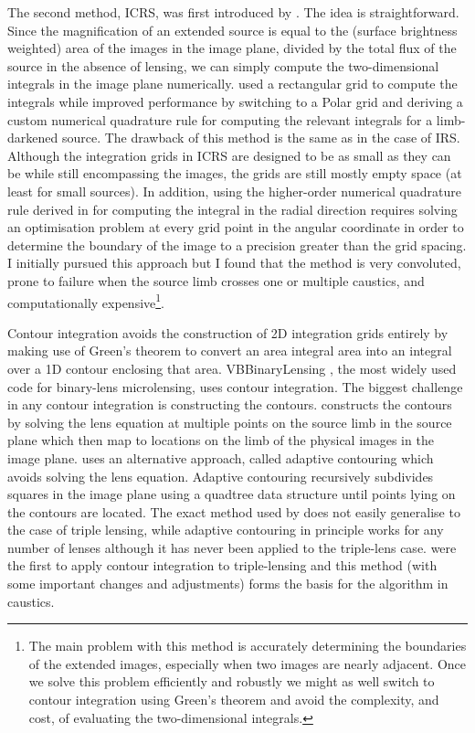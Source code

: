 \documentclass[12pt,dvipsnames]{report}
\newcommand{\ssf}[1]{\textsf{#1}}
\begin{document}
The second method, ICRS, was first introduced by \citet{1996ApJ...472..660B}.
The idea is straightforward. Since the magnification of an extended
source is equal to the (surface brightness weighted) area of the images in
the image plane, divided by the total flux of the source in the absence of
lensing, we can simply compute the two-dimensional integrals in the image plane
numerically. \citet{1996ApJ...472..660B} used a rectangular grid to compute the
integrals while \citet{2010ApJ...716.1408B} improved performance by switching
to a Polar grid and deriving a custom numerical quadrature rule for computing
the relevant integrals for a limb-darkened source. The drawback of this method
is the same as in the case of IRS. Although the integration grids in ICRS are
designed to be as small as they can be while still encompassing the images,
the grids are still mostly empty space (at least for small sources).
In addition, using the higher-order numerical quadrature rule derived in
\citet{2010ApJ...716.1408B} for computing the integral in the radial direction
requires solving an optimisation problem at every grid point in the angular
coordinate in order to determine the boundary of the image to a precision
greater than the grid spacing. 
I initially pursued this approach but I found that the
method is very convoluted, prone to failure when the source limb crosses one or
multiple caustics, and computationally expensive\footnote{The main problem with
    this method is accurately determining the boundaries of the extended images,
    especially when two images are nearly adjacent. Once we solve this problem
    efficiently and robustly we might as well switch to contour integration using
    Green's theorem and avoid the complexity, and cost, of evaluating the two-dimensional
    integrals.}.

Contour integration avoids the construction of 2D integration
grids entirely by making use of Green's theorem to convert an area integral
area into an integral over a 1D contour enclosing that area.  \ssf{VBBinaryLensing}
\citep{2010MNRAS.408.2188B}, the most widely used code for binary-lens microlensing,
uses contour integration. 
The biggest challenge in  any contour integration is constructing the contours.
\citep{2010MNRAS.408.2188B} constructs the contours by solving the lens
equation at multiple points on the source limb in the source plane which then
map to locations on the limb of the physical images in the image plane.
\citet{2007MNRAS.377.1679D} uses an alternative approach, called \ssf{adaptive
    contouring} which avoids solving the lens equation. Adaptive contouring
recursively subdivides squares in the image plane using a \ssf{quadtree} data
structure until points lying on the contours are located. The exact method used
by \citet{2010MNRAS.408.2188B} does not easily generalise to the case of triple
lensing, while adaptive contouring in principle works for any number of lenses
although it has never been applied to the triple-lens case.
\citet{2021MNRAS.503.6143K} were the first to apply contour integration to
triple-lensing and this method (with some important changes and adjustments)
forms the basis for the algorithm in \ssf{caustics}.
\end{document}
